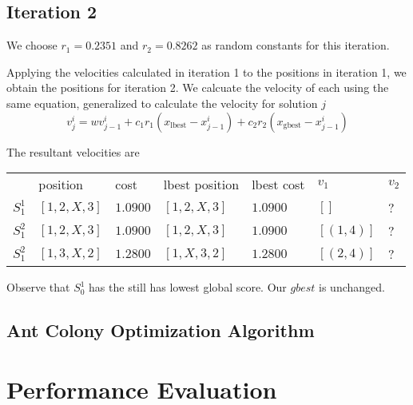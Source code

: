 \documentclass[a4paper]{article}
\begin{document}
\subsection{Iteration 2}

We choose $r_1 = 0.2351$ and $r_2 = 0.8262$ as random constants for this iteration.

Applying the velocities calculated in iteration 1 to the positions in iteration 1, we obtain the positions for iteration 2. We calcuate the velocity of each using the same equation, generalized to calculate the velocity for solution $j$
$$v_j^i = w v_{j-1}^i + c_1 r_1 (x_\text{lbest} - x_{j-1}^i) + c_2 r_2 (x_\text{gbest} - x_{j-1}^i)$$

The resultant velocities are \mbox{}
\begin{center}
\begin{tabular}{lllllll}
        & position       & cost     & lbest position   & lbest cost   & $v_1$      & $v_2$    \\
$S_1^1$ & $[1, 2, X, 3]$ & $1.0900$ & $[1, 2, X, 3]$   & $1.0900$     & $[]      $ & ? \\
$S_1^2$ & $[1, 2, X, 3]$ & $1.0900$ & $[1, 2, X, 3]$   & $1.0900$     & $[(1, 4)]$ & ? \\
$S_1^2$ & $[1, 3, X, 2]$ & $1.2800$ & $[1, X, 3, 2]$   & $1.2800$     & $[(2, 4)]$ & ? \\
\end{tabular}
\end{center}

Observe that $S_0^1$ has the still has lowest global score. Our $\mathit{gbest}$ is unchanged.

\subsection{Ant Colony Optimization Algorithm} %

\section{Performance Evaluation}


\end{document}

